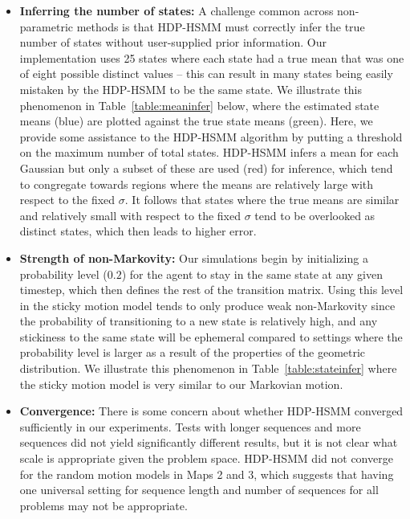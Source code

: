 \documentclass{article}
\begin{document}
\begin{itemize}
  \item \textbf{Inferring the number of states:} A challenge common across non-parametric methods is that HDP-HSMM must correctly infer the true number of states without user-supplied prior information. Our implementation uses 25 states where each state had a true mean that was one of eight possible distinct values -- this can result in many states being easily mistaken by the HDP-HSMM to be the same state. We illustrate this phenomenon in Table~\ref{table:meaninfer} below, where the estimated state means (blue) are plotted against the true state means (green). Here, we provide some assistance to the HDP-HSMM algorithm by putting a threshold on the maximum number of total states. HDP-HSMM infers a mean for each Gaussian but only a subset of these are used (red) for inference, which tend to congregate towards regions where the means are relatively large with respect to the fixed $\sigma$. It follows that states where the true means are similar and relatively small with respect to the fixed $\sigma$ tend to be overlooked as distinct states, which then leads to higher error.
  \item \textbf{Strength of non-Markovity:} Our simulations begin by initializing a probability level ($0.2$) for the agent to stay in the same state at any given timestep, which then defines the rest of the transition matrix. Using this level in the sticky motion model tends to only produce weak non-Markovity since the probability of transitioning to a new state is relatively high, and any stickiness to the same state will be ephemeral compared to settings where the probability level is larger as a result of the properties of the geometric distribution. We illustrate this phenomenon in Table~\ref{table:stateinfer} where the sticky motion model is very similar to our Markovian motion.
  \item \textbf{Convergence:} There is some concern about whether HDP-HSMM converged sufficiently in our experiments. Tests with longer sequences and more sequences did not yield significantly different results, but it is not clear what scale is appropriate given the problem space. HDP-HSMM did not converge for the random motion models in Maps 2 and 3, which suggests that having one universal setting for sequence length and number of sequences for all problems may not be appropriate.
\end{itemize}
\end{document}
